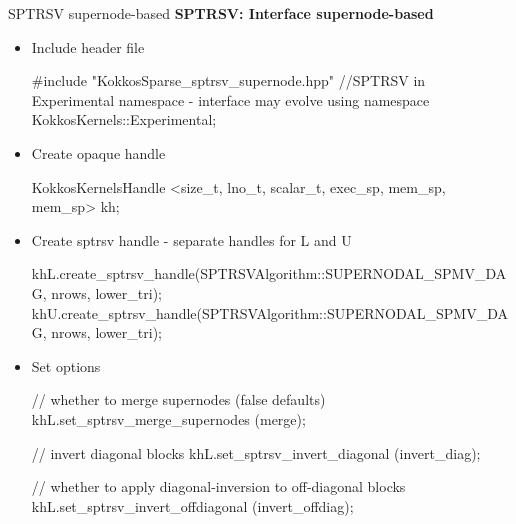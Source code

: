 \begin{frame}[fragile]{SPTRSV supernode-based}
\textbf{SPTRSV: Interface supernode-based}

\begin{itemize}
  \item<2-> Include header file
  \vspace{-0.5em}
  \begin{code}[keywords={parallel_reduce,for,int,double}, basicstyle=\tiny, breaklines=true]
#include "KokkosSparse_sptrsv_supernode.hpp"
//SPTRSV in Experimental namespace - interface may evolve
using namespace KokkosKernels::Experimental;
  \end{code}

  \item<3-> Create opaque handle
  \vspace{-0.5em}
  \begin{code}[keywords={parallel_reduce,for,int,double}, basicstyle=\tiny, breaklines=true]
KokkosKernelsHandle 
<size_t, lno_t, scalar_t, exec_sp, mem_sp, mem_sp> kh;
  \end{code}

  \item<4-> Create sptrsv handle - separate handles for L and U
  \vspace{-0.5em}
  \begin{code}[keywords={parallel_reduce,for,int,double}, basicstyle=\tiny, breaklines=true]
khL.create_sptrsv_handle(SPTRSVAlgorithm::SUPERNODAL_SPMV_DAG, nrows, lower_tri);
khU.create_sptrsv_handle(SPTRSVAlgorithm::SUPERNODAL_SPMV_DAG, nrows, lower_tri);
  \end{code}

  \item<5-> Set options
  \vspace{-0.5em}
  \begin{code}[keywords={parallel_reduce,for,int,double}, basicstyle=\tiny, breaklines=true]
// whether to merge supernodes (false defaults)
khL.set_sptrsv_merge_supernodes (merge);

// invert diagonal blocks
khL.set_sptrsv_invert_diagonal (invert_diag);

// whether to apply diagonal-inversion to off-diagonal blocks
khL.set_sptrsv_invert_offdiagonal (invert_offdiag);
  \end{code}
\end{itemize}
\end{frame}

